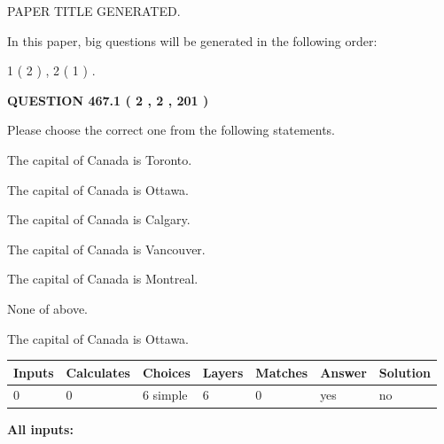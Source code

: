\documentclass[12pt]{article}
\begin{document}
   
 PAPER TITLE GENERATED.
   
   
   
\vspace{0.2in}
   
In this paper, big questions will be generated in the following order: 
   
   
   1 ( 2 )
 ,
   2 ( 1 )
 .
  
\vspace{0.2in}
  
{\textbf{\Large{QUESTION
467.1 
 ( 2 , 2 , 201 )
}}}
  
  
Please choose the correct one from the following statements.
 
 
The capital of Canada is Toronto.
 
 
The capital of Canada is Ottawa.
 
 
The capital of Canada is Calgary.
 
 
The capital of Canada is Vancouver.
 
 
The capital of Canada is Montreal.
 
 
 None of above.
 
 
\noindent{}
 
 
The capital of Canada is Ottawa.
 
 
\noindent{}
 
 
   
   
   
   
\noindent\begin{tabular}{|l|l|l|l|l|l|l|}
 \hline
Inputs & Calculates & Choices & Layers & Matches & Answer & Solution \\ \hline
 0  & 
 0  & 
 6
  simple  
  & 
 6  & 
 0  & 
  yes & 
  no 
  \\ \hline
 \end{tabular}
   
   
   
   
\noindent{}
   
   
   
   
\noindent\vspace{0.1in}\hspace{-0.08in} {\textbf{\Large{All inputs: }}}
   
\end{document}
